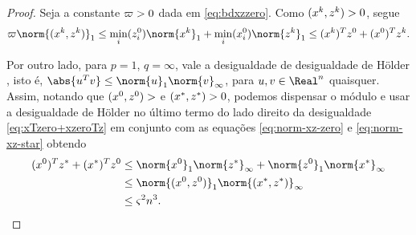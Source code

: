 \begin{proof}
Seja a constante $\varpi>0$ dada em \eqref{eq:bdxzzero}. Como  $(x^{k},z^{k})>0$, segue 
\begin{equation}
	\label{eq:normxz1}
	\bdxzzero\norm{(\xk,\zk)}_{1} \leq \min_{i}(\zzero_{i})\norm{\xk}_{1} + \min_{i}(\xzero_{i})\norm{\zk}_{1}\leq
(\xk)^{T}\zzero + (\xzero)^{T}\zk.
\end{equation}

Por outro lado,  para  $p = 1 $, $q = \infty$, vale a desigualdade de desigualdade de Hölder \cite[p. 53]{Golub:1996wp}, isto é, $\abs{u^{T}v} \leq \norm{u}_{1}\norm{v}_{\infty}$, para $u,v\in\Real^{n}$ quaisquer. Assim, notando que $(x^0,z^0)>$ e $(x^*,z^*)>0$, podemos dispensar o módulo e usar a desigualdade de Hölder no último termo do lado direito da desigualdade \eqref{eq:xTzero+xzeroTz} em conjunto com as  equações \eqref{eq:norm-xz-zero} e \eqref{eq:norm-xz-star}  obtendo
	\begin{align}
	(\xzero)^{T}\zstar + (\xstar)^{T}\zzero  & \leq \norm{\xzero}_{1}\norm{\zstar}_{\infty} + \norm{\zzero}_{1}\norm{\xstar}_{\infty} \notag \\
	& \leq \norm{(\xzero,\zzero)}_1 \norm{(\xstar,\zstar)}_{\infty} \notag \\
	&  \leq \bdxzstar^{2} n^3. \label{eq:norm-star-zero-infty-1} 
	\end{align}




\end{proof}
